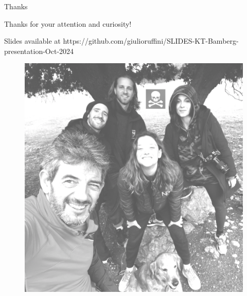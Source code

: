 \begin{frame}[label=ladila]{Thanks}
\vfill
\begin{center}

   {\Large Thanks for your attention and curiosity!}  \vfill
   
    

    
    Slides available at {\small  %
    https://github.com/giulioruffini/SLIDES-KT-Bamberg-presentation-Oct-2024} 
    
        \begin{figure}
            \centering
            \includegraphics[width=0.33\linewidth]{image2.png}
        \end{figure}
\end{center}
\vfill

\end{frame}